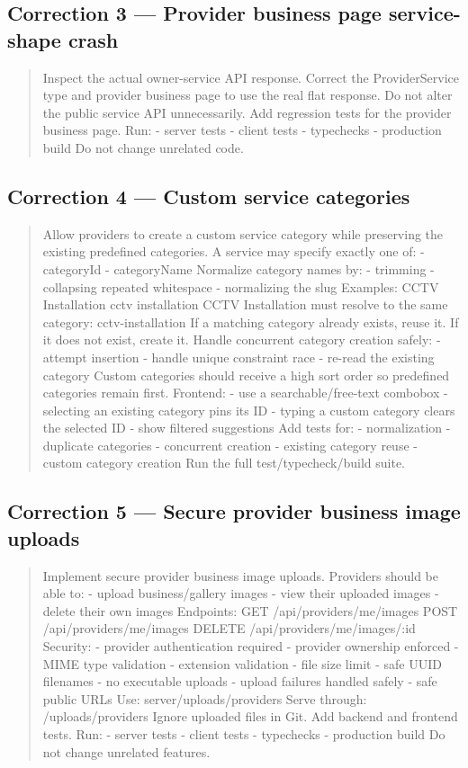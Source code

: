 \subsection*{Correction 3 --- Provider business page service-shape crash}

\begin{quote}
Inspect the actual owner-service API response.
Correct the ProviderService type and provider business page to use the
real flat response.
Do not alter the public service API unnecessarily.
Add regression tests for the provider business page.
Run:
- server tests
- client tests
- typechecks
- production build
Do not change unrelated code.
\end{quote}

\subsection*{Correction 4 --- Custom service categories}

\begin{quote}
Allow providers to create a custom service category while preserving the
existing predefined categories.
A service may specify exactly one of:
- categoryId
- categoryName
Normalize category names by:
- trimming
- collapsing repeated whitespace
- normalizing the slug
Examples:
CCTV Installation
cctv installation
CCTV Installation
must resolve to the same category:
cctv-installation
If a matching category already exists, reuse it.
If it does not exist, create it.
Handle concurrent category creation safely:
- attempt insertion
- handle unique constraint race
- re-read the existing category
Custom categories should receive a high sort order so predefined
categories remain first.
Frontend:
- use a searchable/free-text combobox
- selecting an existing category pins its ID
- typing a custom category clears the selected ID
- show filtered suggestions
Add tests for:
- normalization
- duplicate categories
- concurrent creation
- existing category reuse
- custom category creation
Run the full test/typecheck/build suite.
\end{quote}

\subsection*{Correction 5 --- Secure provider business image uploads}

\begin{quote}
Implement secure provider business image uploads.
Providers should be able to:
- upload business/gallery images
- view their uploaded images
- delete their own images
Endpoints:
GET /api/providers/me/images
POST /api/providers/me/images
DELETE /api/providers/me/images/:id
Security:
- provider authentication required
- provider ownership enforced
- MIME type validation
- extension validation
- file size limit
- safe UUID filenames
- no executable uploads
- upload failures handled safely
- safe public URLs
Use:
server/uploads/providers
Serve through:
/uploads/providers
Ignore uploaded files in Git.
Add backend and frontend tests.
Run:
- server tests
- client tests
- typechecks
- production build
Do not change unrelated features.
\end{quote}

